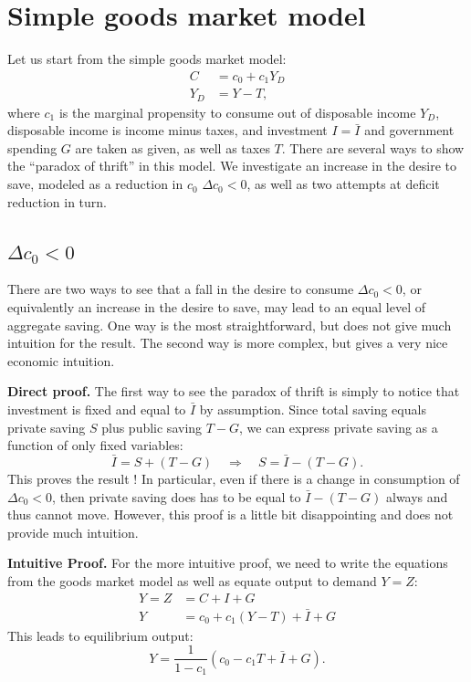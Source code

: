\documentclass[]{book}
\theoremstyle{definition}
\theoremstyle{definition}
\theoremstyle{definition}
\theoremstyle{remark}
\begin{document}
\section{Simple goods market model}\label{simple-paradox-thrift}

Let us start from the simple goods market model: \[
\begin{aligned}
C   &=c_{0}+c_{1}Y_{D}\\
Y_{D}   &=Y-T,
\end{aligned}
\] where \(c_{1}\) is the marginal propensity to consume out of
disposable income \(Y_{D}\), disposable income is income minus taxes,
and investment \(I=\bar{I}\) and government spending \(G\) are taken as
given, as well as taxes \(T\). There are several ways to show the
``paradox of thrift'' in this model. We investigate an increase in the
desire to save, modeled as a reduction in \(c_0\) \(\Delta c_0<0\), as
well as two attempts at deficit reduction in turn.

\subsection{\texorpdfstring{\(\Delta c_{0}<0\)}{\textbackslash{}Delta c\_\{0\}\textless{}0}}\label{delta-c_00}

There are two ways to see that a fall in the desire to consume
\(\Delta c_0 <0\), or equivalently an increase in the desire to save,
may lead to an equal level of aggregate saving. One way is the most
straightforward, but does not give much intuition for the result. The
second way is more complex, but gives a very nice economic intuition.

\textbf{Direct proof.} The first way to see the paradox of thrift is
simply to notice that investment is fixed and equal to \(\bar{I}\) by
assumption. Since total saving equals private saving \(S\) plus public
saving \(T-G\), we can express private saving as a function of only
fixed variables:
\[\bar{I}=S+\left(T-G\right)\quad\Rightarrow\quad S=\bar{I}-\left(T-G\right).\]
This proves the result ! In particular, even if there is a change in
consumption of \(\Delta c_{0}<0\), then private saving does has to be
equal to \(\bar{I}-\left(T-G\right)\) always and thus cannot move.
However, this proof is a little bit disappointing and does not provide
much intuition.

\textbf{Intuitive Proof.} For the more intuitive proof, we need to write
the equations from the goods market model as well as equate output to
demand \(Y=Z\): \[\begin{aligned}
Y   =Z&=C+I+G\\
Y   &=c_{0}+c_{1}(Y-T)+\bar{I}+G
\end{aligned}\] This leads to equilibrium output:
\[Y=\frac{1}{1-c_{1}}\left(c_{0}-c_{1}T+\bar{I}+G\right).\]
\end{document}
